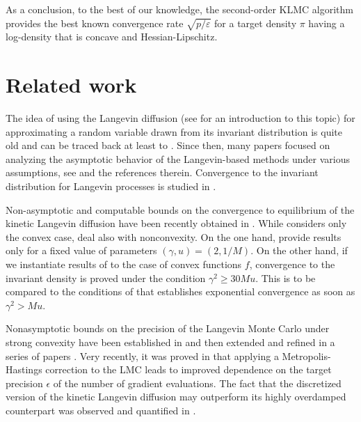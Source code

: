 \documentclass[a4paper,bej,preprint,reqno]{imsart}
\begin{document}
As a conclusion, to the best of our knowledge, the second-order KLMC algorithm
provides the best known convergence rate $\sqrt{p/\varepsilon}$ for a target density
$\pi$ having a log-density that is concave and Hessian-Lipschitz.


\section{Related work}\label{sec:relwork}

The idea of using the Langevin diffusion (see \citep{Pavliotis14} for an introduction
to this topic) for approximating a random variable drawn from its invariant distribution
is quite old and can be traced back at least to \citep{RobertsTweedie96}. Since then,
many papers focused on analyzing the asymptotic behavior of the Langevin-based methods
under various assumptions, see \citep{Lamberton1,Lamberton2,StramerTweedie99-1,StramerTweedie99-2, douc2004,Pillai2012,
Xifara14,RobertsStramer02,RobertsRosenthal98,Hairer2013} and the references therein.
Convergence to the invariant distribution for Langevin processes is studied
in \citep{Desvillettes,Helffer,Dolbeault}.

Non-asymptotic and computable bounds on the convergence
to equilibrium of the kinetic Langevin diffusion have been recently obtained in
\citep{Eberle, 2018Cheng,Cheng2}. While \citep{Cheng2} considers only the convex case,
\citep{Eberle, 2018Cheng} deal also with nonconvexity. On the one hand,
\citep{2018Cheng} provide results only for a fixed value of parameters $(\gamma,u) = (2,1/M)$.
On the other hand, if we instantiate results of \citep{Eberle} to the case of convex functions $f$,
convergence to the invariant density is proved under the condition $\gamma^2\ge 30 Mu$.
This is to be compared to the conditions of  that establishes exponential
convergence as soon as $\gamma^2> Mu$.

Nonasymptotic bounds on the precision of the Langevin Monte Carlo under strong convexity
have been established in \citep{Dal14} and then extended and refined in a series of papers
\citep{Durmus2,Bubeck15,DalalyanColt,Cheng1,durmus2017,brosse17a,Durmus4,luu,pmlr-v75-bernton18a}. Very recently, it was proved in \citep{pmlr-v75-dwivedi18a} that applying
a Metropolis-Hastings correction to the LMC leads to improved dependence on the
target precision $\epsilon$ of the number of gradient evaluations. The fact that the discretized version of the kinetic Langevin diffusion may outperform its highly
overdamped counterpart was observed and quantified in \citep{Cheng2}.
\end{document}
